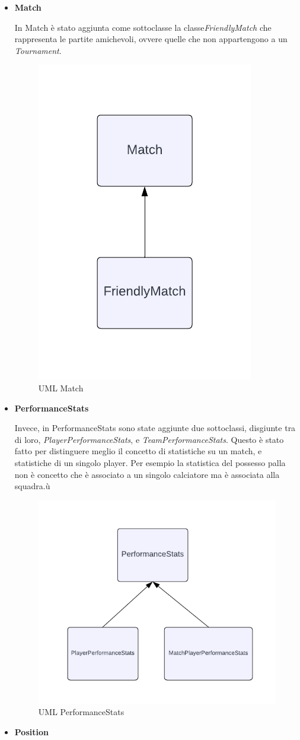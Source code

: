 \documentclass[11pt]{report} %
\begin{document}
 \begin{itemize}
     \item \textbf{Match}

     In Match è stato aggiunta come sottoclasse la  classe\textit{FriendlyMatch} che rappresenta le partite amichevoli, ovvere quelle che non appartengono a un \textit{Tournament}.
    \begin{figure}[H]
        \centering
        \includegraphics[width=0.3\linewidth]{MATCH.png}
        \caption{UML Match}
    \end{figure}
     \item \textbf{PerformanceStats}

     Invece, in PerformanceStats sono state aggiunte due sottoclassi, disgiunte tra di loro, \textit{PlayerPerformanceStats}, e \textit{TeamPerformanceStats}. Questo è stato fatto per distinguere meglio il concetto di statistiche su un match, e statistiche di un singolo player.
     Per esempio la statistica del possesso palla non è concetto che è associato a un singolo calciatore ma è associata alla squadra.ù
     \begin{figure}[H]
         \centering
         \includegraphics[width=0.4\linewidth]{STATS.png}
         \caption{UML PerformanceStats}
     \end{figure}
     \item \textbf{Position}


\end{itemize}
\end{document}

